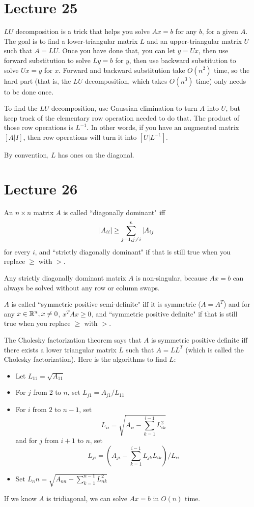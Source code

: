 \documentclass{article}
\begin{document}
\section{Lecture 25}
$LU$ decomposition is a trick that helps you solve $Ax=b$ for any $b$, for a given $A$. The goal is to find a lower-triangular matrix $L$ and an upper-triangular matrix $U$ such that $A=LU$. Once you have done that, you can let $y=Ux$, then use forward substitution to solve $Ly=b$ for $y$, then use backward substitution to solve $Ux=y$ for $x$. Forward and backward substitution take $O(n^2)$ time, so the hard part (that is, the $LU$ decomposition, which takes $O(n^3)$ time) only needs to be done once.
\par
To find the $LU$ decomposition, use Gaussian elimination to turn $A$ into $U$, but keep track of the elementary row operation needed to do that. The product of those row operations is $L^{-1}$. In other words, if you have an augmented matrix $[A|I]$, then row operations will turn it into $[U|L^{-1}]$.
\par
By convention, $L$ has ones on the diagonal.

\section{Lecture 26}
An $n \times n$ matrix $A$ is called ``diagonally dominant" iff
\[ \left\lvert A_{ii} \right\rvert \geq \sum_{j=1,j\neq i}^n \left\lvert A_{ij} \right\rvert \]
for every $i$, and ``strictly diagonally dominant" if that is still true when you replace $\geq$ with $>$.
\par
Any strictly diagonally dominant matrix $A$ is non-singular, because $Ax=b$ can always be solved without any row or column swaps.
\par
$A$ is called ``symmetric positive semi-definite" iff it is symmetric ($A=A^T$) and for any $x \in \mathbb{R}^n, x \neq 0$, $x^T A x \geq 0$, and ``symmetric positive definite" if that is still true when you replace $\geq$ with $>$.
\par
The Cholesky factorization theorem says that $A$ is symmetric positive definite iff there exists a lower triangular matrix $L$ such that $A=LL^T$ (which is called the Cholesky factorization). Here is the algorithms to find $L$:
\begin{itemize}
    \item Let $L_{11}= \sqrt{A_{11}}$
    \item For $j$ from $2$ to $n$, set $L_{j1}=A_{j1}/L_{11}$
    \item For $i$ from $2$ to $n-1$, set
        \[ L_{ii}= \sqrt{ A_{ii}-\sum_{k=1}^{i-1} L_{ik}^2 } \]
        and for $j$ from $i+1$ to $n$, set
        \[ L_{ji} = \left( A_{ji}-\sum_{k=1}^{i-1} L_{jk}L_{ik} \right) / L_{ii} \]
    \item Set $L_nn = \sqrt{A_{nn} - \sum_{k=1}^{n-1} L_{nk}^2}$
\end{itemize}
If we know $A$ is tridiagonal, we can solve $Ax=b$ in $O(n)$ time.
\end{document}
